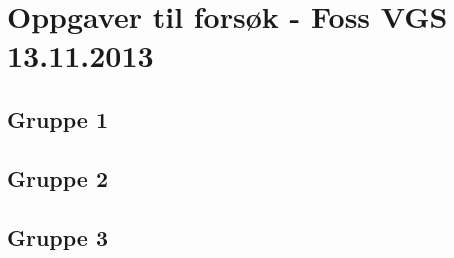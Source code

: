 \section{Oppgaver til forsøk - Foss VGS 13.11.2013}

\subsection{Gruppe 1}

\subsection{Gruppe 2}

\subsection{Gruppe 3}